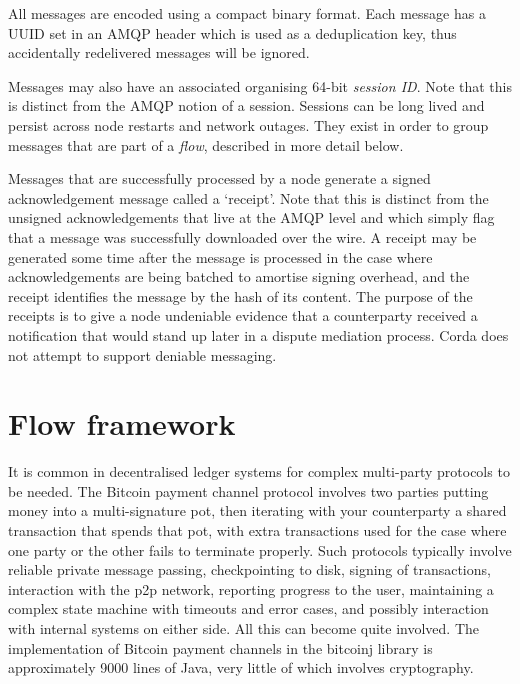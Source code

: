 \documentclass{article}
\begin{document}
All messages are encoded using a compact binary format. Each message has a UUID set in an AMQP header which is used
as a deduplication key, thus accidentally redelivered messages will be ignored.


Messages may also have an associated organising 64-bit \emph{session ID}. Note that this is distinct from the AMQP
notion of a session. Sessions can be long lived and persist across node restarts and network outages. They exist in order
to group messages that are part of a \emph{flow}, described in more detail below.

Messages that are successfully processed by a node generate a signed acknowledgement message called a `receipt'. Note that
this is distinct from the unsigned acknowledgements that live at the AMQP level and which simply flag that a message was
successfully downloaded over the wire. A receipt may be generated some time after the message is processed in the case
where acknowledgements are being batched to amortise signing overhead, and the receipt identifies the message by the hash
of its content. The purpose of the receipts is to give a node undeniable evidence that a counterparty received a
notification that would stand up later in a dispute mediation process. Corda does not attempt to support deniable
messaging.

\section{Flow framework}\label{sec:flows}

It is common in decentralised ledger systems for complex multi-party protocols to be needed. The Bitcoin payment channel
protocol\cite{PaymentChannels} involves two parties putting money into a multi-signature pot, then iterating with your
counterparty a shared transaction that spends that pot, with extra transactions used for the case where one party or the
other fails to terminate properly. Such protocols typically involve reliable private message passing, checkpointing to
disk, signing of transactions, interaction with the p2p network, reporting progress to the user, maintaining a complex
state machine with timeouts and error cases, and possibly interaction with internal systems on either side. All
this can become quite involved. The implementation of Bitcoin payment channels in the bitcoinj library is approximately
9000 lines of Java, very little of which involves cryptography.
\end{document}
